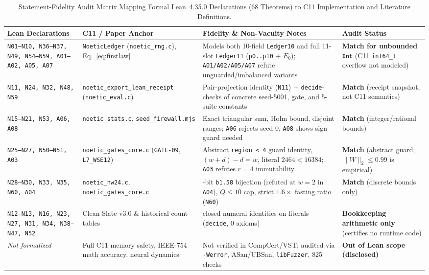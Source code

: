 \documentclass[11pt,reqno]{amsart}
\theoremstyle{remark}
\begin{document}
\begin{table}[ht]
\centering
\caption{Statement-Fidelity Audit Matrix Mapping Formal Lean~4.35.0 Declarations (68 Theorems) to C11 Implementation and Literature Definitions.}
\label{tab:fidelity}
\footnotesize
\setlength{\tabcolsep}{3.5pt}
\begin{tabular}{@{} >{\raggedright\arraybackslash}p{3.0cm} >{\raggedright\arraybackslash}p{3.3cm} >{\raggedright\arraybackslash}p{4.0cm} >{\raggedright\arraybackslash}p{2.8cm} @{}}
\toprule
\textbf{Lean Declarations} & \textbf{C11 / Paper Anchor} & \textbf{Fidelity \& Non-Vacuity Notes} & \textbf{Audit Status} \\
\midrule
\texttt{N01--N10, N36--N37, N49, N54--N59, A01--A02, A05, A07} & \texttt{NoeticLedger} (\texttt{noetic\_rng.c}), Eq.~\eqref{eq:firstlaw} & Models both 10-field \texttt{Ledger10} and full 11-slot \texttt{Ledger11} (\texttt{p0..p10} + $E_0$); \texttt{A01/A02/A05/A07} refute unguarded/imbalanced variants & \textbf{Match for unbounded \texttt{Int}} (C11 \texttt{int64\_t} overflow not modeled) \\
\texttt{N11, N24, N32, N48, N59} & \texttt{noetic\_\allowbreak export\_\allowbreak lean\_\allowbreak receipt} (\texttt{noetic\_eval.c}) & Pair-projection identity (\texttt{N11}) + \texttt{decide}-checks of concrete seed-5001, gate, and 5-suite constants & \textbf{Match} (receipt snapshot, not C11 semantics) \\
\texttt{N15--N21, N53, A06, A08} & \texttt{noetic\_stats.c}, \texttt{seed\_\allowbreak firewall.mjs} \cite{wilcoxon1945,holm1979} & Exact triangular sum, Holm bound, disjoint ranges; \texttt{A06} rejects seed 0, \texttt{A08} shows sign guard needed & \textbf{Match} (integer/rational bounds) \\
\texttt{N25--N27, N50--N51, A03} & \texttt{noetic\_\allowbreak gates\_\allowbreak core.c} (\texttt{GATE-09}, \texttt{L7\_WSE12}) & Abstract \texttt{region < 4} guard identity, $(w+d)-d=w$, literal $2464<16384$; \texttt{A03} refutes $r=4$ immutability & \textbf{Match} (abstract guard; $\|W\|_2 \le 0.99$ is empirical) \\
\texttt{N28--N30, N33, N35, N60, A04} & \texttt{noetic\_hw24.c}, \texttt{noetic\_\allowbreak gates\_\allowbreak core.c} \cite{macklin2016,ma2024} & 2-bit \texttt{b1.58} bijection (refuted at $w=2$ in \texttt{A04}), $Q \le 10$ cap, strict $1.6\times$ fasting ratio (\texttt{N60}) & \textbf{Match} (discrete bounds only) \\
\texttt{N12--N13, N16, N23, N27, N31, N34, N38--N47, N52} & Clean-Slate v3.0 \& historical count tables & 18 closed numeral identities on literals (\texttt{decide}, 0 axioms) & \textbf{Bookkeeping arithmetic only} (certifies no runtime code) \\
\emph{Not formalized} & Full C11 memory safety, IEEE-754 math accuracy, neural dynamics & Not verified in CompCert/VST; audited via \texttt{-Werror}, ASan/UBSan, \texttt{libFuzzer}, 825 checks & \textbf{Out of Lean scope (disclosed)} \\
\bottomrule
\end{tabular}
\end{table}
\end{document}
